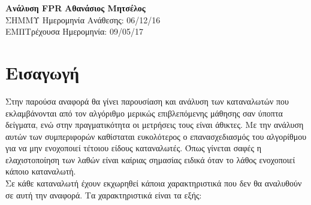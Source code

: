 \documentclass[a4paper, 11pt]{article}
\begin{document}
\noindent
\large\textbf{Ανάλυση FPR} \hfill \textbf{Αθανάσιος Μητσέλος} \\
\normalsize ΣΗΜΜΥ \hfill Ημερομηνία Ανάθεσης: 06/12/16  \\
ΕΜΠ\hfill Τρέχουσα Ημερομηνία: 09/05/17 \\


\section*{Εισαγωγή}
Στην παρούσα αναφορά θα γίνει παρουσίαση και ανάλυση των καταναλωτών που εκλαμβάνονται από τον αλγόριθμο μερικώς επιβλεπόμενης μάθησης σαν ύποπτα δείγματα, ενώ στην πραγματικότητα οι μετρήσεις τους είναι άθικτες. Με την ανάλυση αυτών των συμπεριφορών καθίσταται ευκολότερος ο επανασχεδιασμός του αλγορίθμου για να μην ενοχοποιεί τέτοιου είδους καταναλωτές. Όπως γίνεται σαφές η ελαχιστοποίηση των λαθών είναι καίριας σημασίας ειδικά όταν το λάθος ενοχοποιεί κάποιο καταναλωτή. \\
Σε κάθε καταναλωτή έχουν εκχωρηθεί κάποια χαρακτηριστικά που δεν θα αναλυθούν σε αυτή την αναφορά. Τα χαρακτηριστικά είναι τα εξής:    
\end{document}
